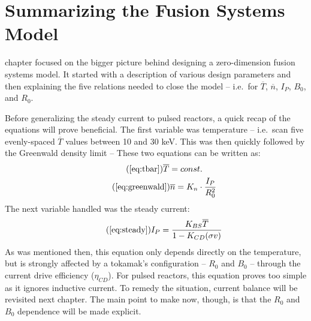 \section{Summarizing the Fusion Systems Model}

 chapter focused on the bigger picture behind designing a zero-dimension fusion systems model. It started with a description of various design parameters and then  explaining the five relations needed to close the model -- i.e.\ for $\overline T$, $\overline n$, $I_P$, $B_0$, and $R_0$.

Before generalizing the steady current to  pulsed reactors,  a quick recap of the equations will prove beneficial. The first variable  was temperature -- i.e.\ scan five evenly-spaced $\overline T$ values between 10 and 30 keV. This was then quickly followed by the Greenwald density limit --  These two equations can be written as:
\begin{gather}
	\tag{\ref{eq:tbar}}
	\overline T = const. \\
	\tag{\ref{eq:greenwald}}
	\overline n = K_n \cdot \frac{I_P}{R_0^2}
\end{gather}
The next variable handled was the steady current:
\begin{equation}
	\tag{\ref{eq:steady}}
	I_P = \frac{K_{BS} \overline T}{1 - K_{CD} ( \sigma v ) }
\end{equation}
As was mentioned then, this equation only depends directly on the temperature, but is strongly affected by a tokamak's configuration -- $R_0$ and $B_0$ -- through the current drive efficiency ($\eta_{CD}$). For pulsed reactors, this equation proves too simple as it ignores inductive current. To remedy the situation, current balance will be revisited next chapter. The main point to make now, though, is that the $R_0$ and $B_0$ dependence will be made explicit.

